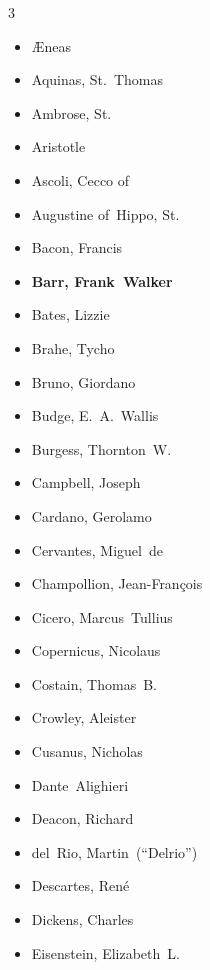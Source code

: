 \documentclass[10pt,makeidx]{extreport}
\begin{document}
\begin{multicols}{3}
\begin{itemize}
  \item Æneas
  \item Aquinas, St.~Thomas
  \item Ambrose, St.
  \item Aristotle
  \item Ascoli, Cecco of
  \item Augustine of~Hippo, St.
  \item Bacon, Francis
  \item \textbf{Barr, Frank~Walker}
  \item Bates, Lizzie
  \item Brahe, Tycho
  \item Bruno, Giordano
  \item Budge, E.~A.~Wallis
  \item Burgess, Thornton~W.
  \item Campbell, Joseph
  \item Cardano, Gerolamo
  \item Cervantes, Miguel~de
  \item Champollion, Jean-François
  \item Cicero, Marcus~Tullius
  \item Copernicus, Nicolaus
  \item Costain, Thomas~B.
  \item Crowley, Aleister
  \item Cusanus, Nicholas
  \item Dante~Alighieri
  \item Deacon, Richard
  \item del~Rio, Martin~(“Delrio”)
  \item Descartes, René
  \item Dickens, Charles
  \item Eisenstein, Elizabeth~L.

\end{itemize}
\end{multicols}
\end{document}
